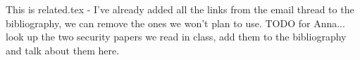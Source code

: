 This is related.tex - I've already added all the links from the email thread to the bibliography, we can remove the ones we won't plan to use.
TODO for Anna... look up the two security papers we read in class, add them to the bibliography and talk about them here.
